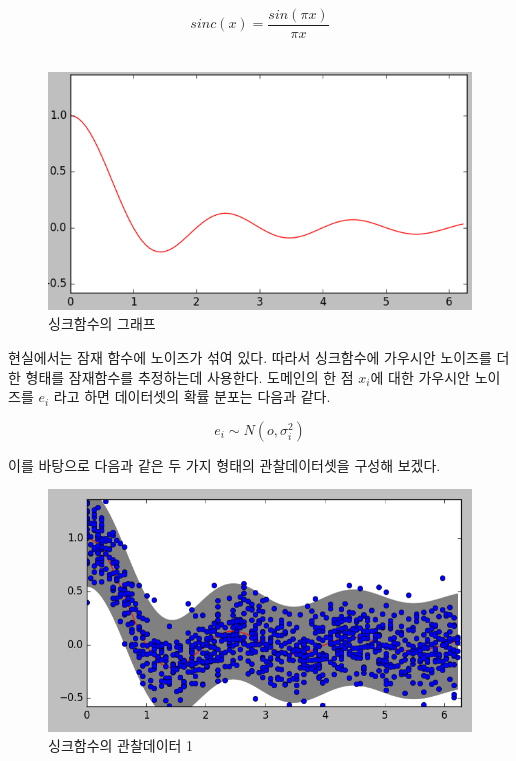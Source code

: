 \documentclass[a4paper]{oblivoir}
\begin{document}
\begin{equation}
sinc(x) = \frac{sin(\pi x)}{\pi x}
\label{eq:12-1}
\end{equation} 
\\

\begin{figure}[ht] \centering 
\includegraphics[scale=0.6]{fig12_4.png} 
\caption{싱크함수의 그래프}
\label{fig:12-3}
\end{figure} 

현실에서는 잠재 함수에 노이즈가 섞여 있다. 따라서 싱크함수에 가우시안 노이즈를 더한 형태를 잠재함수를 추정하는데 사용한다. 도메인의 한 점 $x_{i}$에 대한 가우시안 노이즈를 $e_{i}$ 라고 하면 데이터셋의 확률 분포는 다음과 같다.

\begin{equation}
e_{i} \sim N(o,\sigma_{i}^{2})
\label{eq:12-2}
\end{equation} 

이를 바탕으로 다음과 같은 두 가지 형태의 관찰데이터셋을 구성해 보겠다.\\

\begin{figure}[ht] \centering 
\includegraphics[scale=0.6]{fig12_5.png} 
\caption{싱크함수의 관찰데이터 1}
\label{fig:12-4}
\end{figure} 
\end{document}
